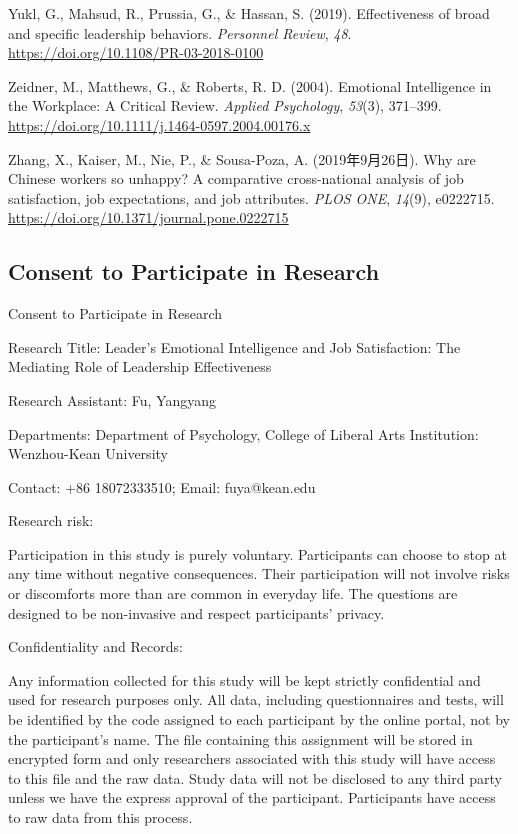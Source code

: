 \documentclass[
  man,
  longtable,
  nolmodern,
  notxfonts,
  notimes,
  colorlinks=true,linkcolor=blue,citecolor=blue,urlcolor=blue]{apa7}
\newlength{\cslhangindent}
\newenvironment{CSLReferences}[2] %
 {\begin{list}{}{%
  \setlength{\itemindent}{0pt}
  \setlength{\leftmargin}{0pt}
  \setlength{\parsep}{0pt}
  \ifodd #1
   \setlength{\leftmargin}{\cslhangindent}
   \setlength{\itemindent}{-1\cslhangindent}
  \fi
  \setlength{\itemsep}{#2\baselineskip}}}
 {\end{list}}
\begin{document}
\begin{CSLReferences}{1}{0}
Yukl, G., Mahsud, R., Prussia, G., \& Hassan, S. (2019). Effectiveness
of broad and specific leadership behaviors. \emph{Personnel Review},
\emph{48}. \url{https://doi.org/10.1108/PR-03-2018-0100}

Zeidner, M., Matthews, G., \& Roberts, R. D. (2004). Emotional
{Intelligence} in the {Workplace}: {A Critical Review}. \emph{Applied
Psychology}, \emph{53}(3), 371--399.
\url{https://doi.org/10.1111/j.1464-0597.2004.00176.x}

Zhang, X., Kaiser, M., Nie, P., \& Sousa-Poza, A. (2019年9月26日). Why
are {Chinese} workers so unhappy? {A} comparative cross-national
analysis of job satisfaction, job expectations, and job attributes.
\emph{PLOS ONE}, \emph{14}(9), e0222715.
\url{https://doi.org/10.1371/journal.pone.0222715}

\end{CSLReferences}

\appendix

\subsection{Consent to Participate in
Research}\label{consent-to-participate-in-research}

Consent to Participate in Research

Research Title: Leader's Emotional Intelligence and Job Satisfaction:
The Mediating Role of Leadership Effectiveness

Research Assistant: Fu, Yangyang

Departments: Department of Psychology, College of Liberal Arts
Institution: Wenzhou-Kean University

Contact: +86 18072333510; Email: fuya@kean.edu

Research risk:

Participation in this study is purely voluntary. Participants can choose
to stop at any time without negative consequences. Their participation
will not involve risks or discomforts more than are common in everyday
life. The questions are designed to be non-invasive and respect
participants' privacy.

Confidentiality and Records:

Any information collected for this study will be kept strictly
confidential and used for research purposes only. All data, including
questionnaires and tests, will be identified by the code assigned to
each participant by the online portal, not by the participant's name.
The file containing this assignment will be stored in encrypted form and
only researchers associated with this study will have access to this
file and the raw data. Study data will not be disclosed to any third
party unless we have the express approval of the participant.
Participants have access to raw data from this process.
\end{document}
